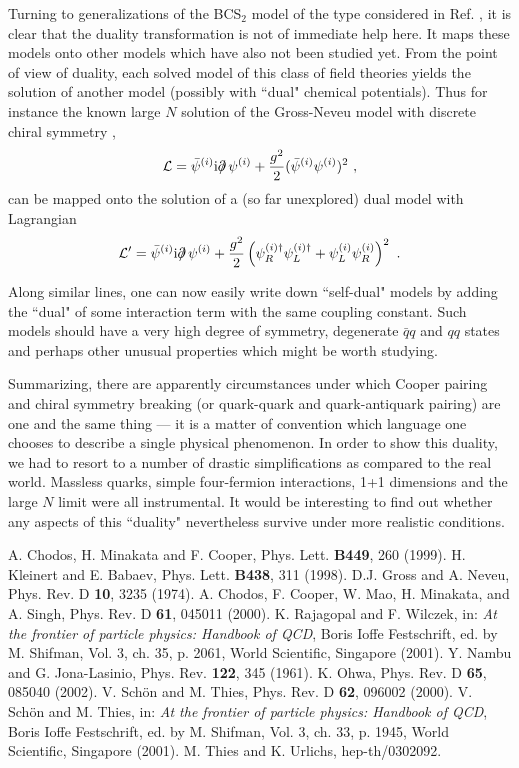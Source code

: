 \documentclass[a4paper,twocolumn,aps]{revtex4}
\begin{document}
Turning to generalizations of the BCS$_2$ model of the type considered in Ref. \cite{R4}, 
it is clear that the duality transformation is not of immediate help here. It maps these models onto 
other models which have also not been studied yet. From the point of view of duality, each solved model
of this class of field theories
yields the solution of another model (possibly with ``dual" chemical potentials). Thus for instance the
known large $N$ solution of the Gross-Neveu model with discrete chiral symmetry \cite{R2,R10},
\begin{equation}
{\cal L}= \bar{\psi}^{(i)} {\rm i} \partial \!\!\!/ \, \psi^{(i)} +
\frac{g^2}{2} (\bar{\psi}^{(i)}\psi^{(i)})^2 \ ,
\label{eq11p}
\end{equation} 
can be mapped onto the solution of a (so far unexplored) dual model with Lagrangian
\begin{equation}
{\cal L}'= \bar{\psi}^{(i)} {\rm i} \partial \!\!\!/ \, \psi^{(i)} +
\frac{g^2}{2} \left(\psi_R^{(i)\dagger}\psi_L^{(i)\dagger} +  \psi_L^{(i)}\psi_R^{(i)}\right)^2 \ .
\label{eq12p}
\end{equation}

Along similar lines, one can now easily write down ``self-dual" models by adding the ``dual" of
some interaction term with the same coupling constant. Such models should have
a very high degree of symmetry, degenerate $\bar{q}q$ and $qq$ states and 
perhaps other unusual properties which might be worth studying.

Summarizing, there are apparently circumstances under which Cooper pairing and
chiral symmetry breaking (or quark-quark and  quark-antiquark pairing)
are one and the same thing ---  it is a matter of convention which language one chooses
to describe a single physical phenomenon.  
In order to show this duality, we had to resort to a number of drastic simplifications 
as compared to the real world. Massless quarks, simple four-fermion interactions, 
1+1 dimensions and the large $N$ limit
were all instrumental. It would be interesting to find out whether any aspects
of this ``duality" nevertheless survive under more realistic conditions. 
\newpage

\begin{references} 
A. Chodos, H. Minakata and F. Cooper, Phys. Lett. {\bf B449}, 260 (1999).
H. Kleinert and E. Babaev, Phys. Lett. {\bf B438}, 311 (1998).
D.J. Gross and A. Neveu, Phys. Rev. D {\bf 10}, 3235 (1974).
A. Chodos, F. Cooper, W. Mao, H. Minakata, and A. Singh, Phys. Rev. D {\bf 61}, 045011 (2000).
K. Rajagopal and F. Wilczek, in: {\em At the frontier of particle physics: Handbook of QCD}, 
Boris Ioffe Festschrift, ed. by M. Shifman, Vol. 3, ch. 35, p. 2061, World Scientific,
Singapore (2001).
Y. Nambu and G. Jona-Lasinio, Phys. Rev. {\bf 122}, 345 (1961).
K. Ohwa, Phys. Rev. D {\bf 65}, 085040 (2002).
V. Sch\"on and M. Thies, Phys. Rev. D {\bf 62}, 096002 (2000).
V. Sch\"on and M. Thies, in: {\em At the frontier of particle physics: Handbook of QCD}, 
Boris Ioffe Festschrift, ed. by M. Shifman, Vol. 3, ch. 33, p. 1945, World Scientific,
Singapore (2001).
M. Thies and K. Urlichs, hep-th/0302092.
\end{references} 
\end{document}

